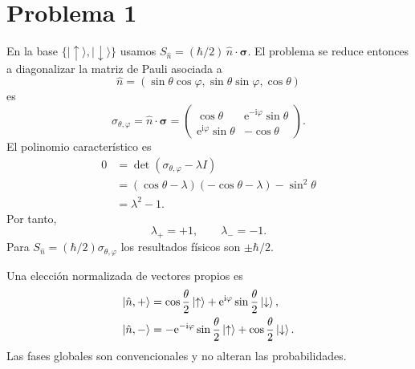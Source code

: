 \documentclass[11pt,a4paper]{article}
\numberwithin{equation}{section}
\renewcommand{\boxed}[1]{#1}
\newcommand{\ii}{\mathrm i}
\newcommand{\e}{\mathrm e}
\newcommand{\hb}{\hbar}
\begin{document}
\section{Problema 1}
En la base $\{|\uparrow\rangle,|\downarrow\rangle\}$ usamos $S_{\hat n}=(\hbar/2)\,\hat n\cdot\boldsymbol\sigma$. El problema se reduce entonces a diagonalizar la matriz de Pauli asociada a
\begin{equation}
\hat n=(\sin\theta\cos\varphi,\sin\theta\sin\varphi,\cos\theta)
\end{equation}
es
\begin{equation}
\sigma_{\theta,\varphi}=\hat n\cdot\bm\sigma
=\begin{pmatrix}
\cos\theta&\e^{-\ii\varphi}\sin\theta\\
\e^{\ii\varphi}\sin\theta&-\cos\theta
\end{pmatrix}.
\end{equation}
El polinomio característico es
\begin{align}
0&=\det(\sigma_{\theta,\varphi}-\lambda I)\\
&=(\cos\theta-\lambda)(-\cos\theta-\lambda)-\sin^2\theta\\
&=\lambda^2-1.
\end{align}
Por tanto,
\begin{equation}
\boxed{\lambda_+=+1,\qquad \lambda_-=-1.}
\end{equation}
Para $S_{\hat n}=(\hb/2)\sigma_{\theta,\varphi}$ los resultados físicos son $\pm\hb/2$.

Una elección normalizada de vectores propios es
\begin{align}
\ket{\hat n,+}&=\cos\frac\theta2\ket\uparrow
+\e^{\ii\varphi}\sin\frac\theta2\ket\downarrow,\\
\ket{\hat n,-}&=-\e^{-\ii\varphi}\sin\frac\theta2\ket\uparrow
+\cos\frac\theta2\ket\downarrow.
\end{align}
Las fases globales son convencionales y no alteran las probabilidades.
\end{document}
